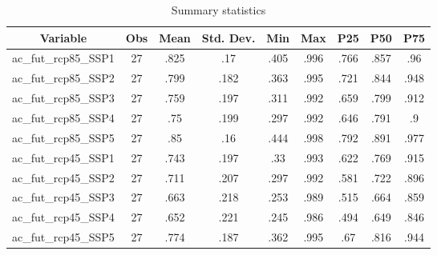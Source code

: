 \begin{table}[htbp]\centering \caption{Summary statistics\label{sumstat}}
\begin{tabular}{l c c c c c c c c}\hline\hline
\multicolumn{1}{c}{Variable} & Obs & Mean & Std. Dev.
 & Min & Max & P25 & P50 & P75  \\ \hline
ac\_fut\_rcp85\_SSP1 & 27 & .825 & .17 & .405 & .996 & .766 & .857 & .96 \\
ac\_fut\_rcp85\_SSP2 & 27 & .799 & .182 & .363 & .995 & .721 & .844 & .948 \\
ac\_fut\_rcp85\_SSP3 & 27 & .759 & .197 & .311 & .992 & .659 & .799 & .912 \\
ac\_fut\_rcp85\_SSP4 & 27 & .75 & .199 & .297 & .992 & .646 & .791 & .9 \\
ac\_fut\_rcp85\_SSP5 & 27 & .85 & .16 & .444 & .998 & .792 & .891 & .977 \\
ac\_fut\_rcp45\_SSP1 & 27 & .743 & .197 & .33 & .993 & .622 & .769 & .915 \\
ac\_fut\_rcp45\_SSP2 & 27 & .711 & .207 & .297 & .992 & .581 & .722 & .896 \\
ac\_fut\_rcp45\_SSP3 & 27 & .663 & .218 & .253 & .989 & .515 & .664 & .859 \\
ac\_fut\_rcp45\_SSP4 & 27 & .652 & .221 & .245 & .986 & .494 & .649 & .846 \\
ac\_fut\_rcp45\_SSP5 & 27 & .774 & .187 & .362 & .995 & .67 & .816 & .944 \\
\hline\end{tabular}
\end{table}
